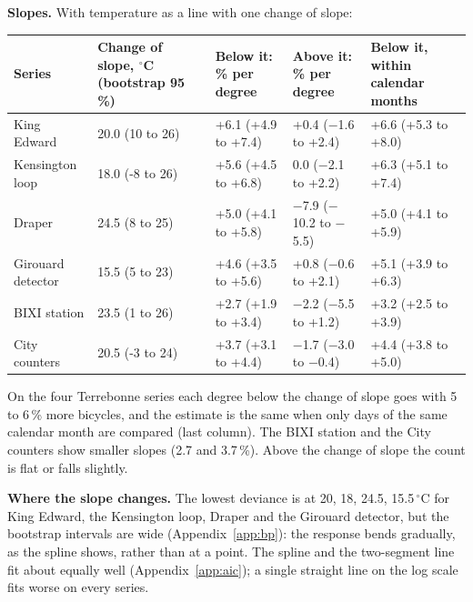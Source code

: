 \documentclass[11pt,a4paper]{article}
\begin{document}
\textbf{Slopes.} With temperature as a line with one change of slope:
\begin{center}\small\begin{tabular}{@{}lp{2.9cm}p{3.2cm}p{3.2cm}p{3.2cm}@{}}\toprule
Series & Change of slope, $^\circ$C (bootstrap 95\,\%) & Below it: \% per degree & Above it: \% per degree & Below it, within calendar months\\\midrule
King Edward & 20.0 (10 to 26) & +6.1 (+4.9 to +7.4) & +0.4 ($-$1.6 to +2.4) & +6.6 (+5.3 to +8.0) \\
Kensington loop & 18.0 (-8 to 26) & +5.6 (+4.5 to +6.8) & 0.0 ($-$2.1 to +2.2) & +6.3 (+5.1 to +7.4) \\
Draper & 24.5 (8 to 25) & +5.0 (+4.1 to +5.8) & $-$7.9 ($-$10.2 to $-$5.5) & +5.0 (+4.1 to +5.9) \\
Girouard detector & 15.5 (5 to 23) & +4.6 (+3.5 to +5.6) & +0.8 ($-$0.6 to +2.1) & +5.1 (+3.9 to +6.3) \\
BIXI station & 23.5 (1 to 26) & +2.7 (+1.9 to +3.4) & $-$2.2 ($-$5.5 to +1.2) & +3.2 (+2.5 to +3.9) \\
City counters & 20.5 (-3 to 24) & +3.7 (+3.1 to +4.4) & $-$1.7 ($-$3.0 to $-$0.4) & +4.4 (+3.8 to +5.0) \\
\bottomrule\end{tabular}\end{center}
On the four Terrebonne series each degree below the change of slope goes with 5 to 6\,\% more bicycles, and the estimate is the same when only days of the same calendar month are compared (last column). The BIXI station and the City counters show smaller slopes (2.7 and 3.7\,\%). Above the change of slope the count is flat or falls slightly.

\textbf{Where the slope changes.} The lowest deviance is at 20, 18, 24.5, 15.5\,$^\circ$C for King Edward, the Kensington loop, Draper and the Girouard detector, but the bootstrap intervals are wide (Appendix~\ref{app:bp}): the response bends gradually, as the spline shows, rather than at a point. The spline and the two-segment line fit about equally well (Appendix~\ref{app:aic}); a single straight line on the log scale fits worse on every series.
\end{document}
